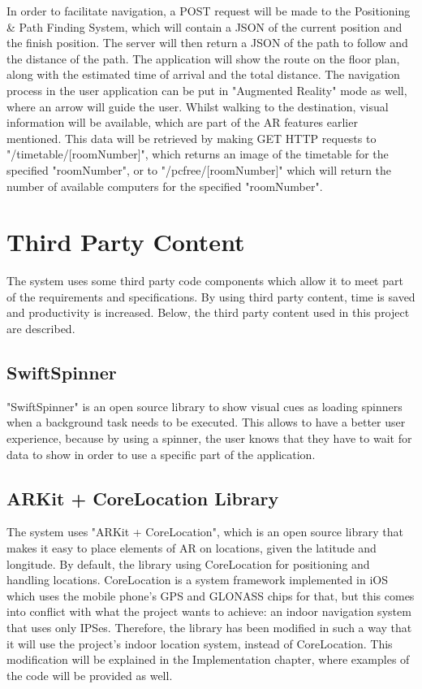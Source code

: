In order to facilitate navigation, a POST request will be made to the Positioning \& Path Finding System, which will contain a JSON of the current position and the finish position. The server will then return a JSON of the path to follow and the distance of the path. The application will show the route on the floor plan, along with the estimated time of arrival and the total distance. The navigation process in the user application can be put in "Augmented Reality" mode as well, where an arrow will guide the user. Whilst walking to the destination, visual information will be available, which are part of the AR features earlier mentioned. This data will be retrieved by making GET HTTP requests to "/timetable/[roomNumber]", which returns an image of the timetable for the specified "roomNumber", or to "/pcfree/[roomNumber]" which will return the number of available computers for the specified "roomNumber".

\section{Third Party Content}
The system uses some third party code components which allow it to meet part of the requirements and specifications. By using third party content, time is saved and productivity is increased. Below, the third party content used in this project are described.

\subsection{SwiftSpinner}
"SwiftSpinner" is an open source library to show visual cues as loading spinners when a background task needs to be executed. This allows to have a better user experience, because by using a spinner, the user knows that they have to wait for data to show in order to use a specific part of the application.

\subsection{ARKit + CoreLocation Library}
The system uses "ARKit + CoreLocation", which is an open source library that makes it easy to place elements of AR on locations, given the latitude and longitude. By default, the library using CoreLocation for positioning and handling locations. CoreLocation is a system framework implemented in iOS which uses the mobile phone's GPS and GLONASS chips for that, but this comes into conflict with what the project wants to achieve: an indoor navigation system that uses only IPSes. Therefore, the library has been modified in such a way that it will use the project's indoor location system, instead of CoreLocation. This modification will be explained in the Implementation chapter, where examples of the code will be provided as well.